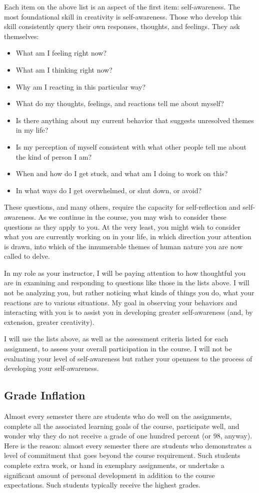 \documentclass[letterpaper,10pt,headsepline]{scrreprt}
\begin{document}
Each item on the above list is an aspect of the first item: self-awareness. The most foundational skill in creativity is self-awareness. Those who develop this skill consistently query their own responses, thoughts, and feelings. They ask themselves:

\begin{itemize}
\item What am I feeling right now?
\item What am I thinking right now?
\item Why am I reacting in this particular way?
\item What do my thoughts, feelings, and reactions tell me about myself?
\item Is there anything about my current behavior that suggests unresolved themes in my life?
\item Is my perception of myself consistent with what other people tell me about the kind of person I am?
\item When and how do I get stuck, and what am I doing to work on this?
\item In what ways do I get overwhelmed, or shut down, or avoid?
 
\end{itemize}

These questions, and many others, require the capacity for self-reflection and self-awareness. As we continue in the course, you may wish to consider these questions as they apply to you. At the very least, you might wish to consider what you are currently working on in your life, in which direction your attention is drawn, into which of the innumerable themes of human nature you are now called to delve.

In my role as your instructor, I will be paying attention to how thoughtful you are in examining and responding to questions like those in the lists above. I will not be analyzing you, but rather noticing what kinds of things you do, what your reactions are to various situations. My goal in observing your behaviors and interacting with you is to assist you in developing greater self-awareness (and, by extension, greater creativity).

I will use the lists above, as well as the assessment criteria listed for each assignment, to assess your overall participation in the course. I will not be evaluating your level of self-awareness but rather your openness to the process of developing your self-awareness.

\subsection{Grade Inflation}
Almost every semester there are students who do well on the assignments, complete all the associated learning goals of the course,
participate well, and wonder why they do not receive a grade of one hundred percent (or 98, anyway). Here is the reason: almost every
semester there are students who demonstrates a level of commitment that goes beyond the course requirement. Such students complete extra
work, or hand in exemplary assignments, or undertake a significant amount of personal development in addition to the course expectations.
Such students typically receive the highest grades.
\end{document}
